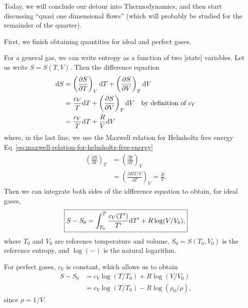 
\lecture{}

Today, we will conclude our detour into Thermodynamics, and then start
discussing ``quasi one dimensional flows'' (which will probably be
studied for the remainder of the quarter).

First, we finish obtaining quantities for ideal and perfect gases.

\begin{node}
For a general gas, we can write entropy as a function of two [state]
variables. Let us write $S=S(T,V)$. Then the difference equation
\begin{subequations}
  \begin{align}
\mathrm{d} S &= \left(\frac{\partial S}{\partial T}\right)_{V}\mathrm{d} T+ \left(\frac{\partial S}{\partial V}\right)_{T}\mathrm{d} V\\
&= \frac{c_{V}}{T}\mathrm{d} T+ \left(\frac{\partial S}{\partial V}\right)_{T}\mathrm{d} V\quad\mbox{by definition of $c_{V}$}\\
&= \frac{c_{V}}{T}\mathrm{d} T + \frac{R}{V}\mathrm{d} V
  \end{align}
\end{subequations}
where, in the last line, we use the Maxwell relation for Helmholtz free energy Eq~\eqref{eq:maxwell-relation-for-helmholtz-free-energy}
\begin{subequations}
  \begin{align}
\left(\frac{\partial S}{\partial V}\right)_{T}
&=\left(\frac{\partial p}{\partial T}\right)_{V}\\
&=\left(\frac{\partial RT/V}{\partial T}\right)_{V}=\frac{R}{V}.
  \end{align}
\end{subequations}
Then we can integrate both sides of the idfference equation to obtain,
for ideal gases,
\begin{equation}
\boxed{S - S_{0} = \int^{T}_{T_{0}}\frac{c_{V}(T')}{T'}\mathrm{d} T' + R\log(V/V_{0}),}
\end{equation}
where $T_{0}$ and $V_{0}$ are reference temperature and volume,
$S_{0}=S(T_{0},V_{0})$ is the reference entropy, and $\log(-)$ is the
natural logarithm.
\end{node}

\begin{node}
For perfect gases, $c_{V}$ is constant, which allows us to obtain
\begin{subequations}
  \begin{align}
S-S_{0} &= c_{V}\log(T/T_{0})+R\log(V/V_{0})\\
&= c_{V}\log(T/T_{0})-R\log(\rho_{0}/\rho),
  \end{align}
\end{subequations}
since $\rho=1/V$.
\end{node}

